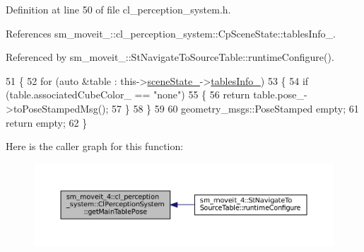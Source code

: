Definition at line 50 of file cl\+\_\+perception\+\_\+system.\+h.



References sm\+\_\+moveit\+\_\+::cl\+\_\+perception\+\_\+system\+::\+Cp\+Scene\+State\+::tables\+Info\+\_\+.



Referenced by sm\+\_\+moveit\+\_\+::\+St\+Navigate\+To\+Source\+Table\+::runtime\+Configure().


\begin{DoxyCode}
51             \{
52                 \textcolor{keywordflow}{for} (\textcolor{keyword}{auto} &table : this->\hyperlink{classsm__moveit__4_1_1cl__perception__system_1_1ClPerceptionSystem_a82ea8feeb2fa43349f91ed59137b3890}{sceneState\_}->\hyperlink{classsm__moveit__4_1_1cl__perception__system_1_1CpSceneState_a95f74dd16566d97e017650ccdf4b8a46}{tablesInfo\_})
53                 \{
54                     \textcolor{keywordflow}{if} (table.associatedCubeColor\_ == \textcolor{stringliteral}{"none"})
55                     \{
56                         \textcolor{keywordflow}{return} table.pose\_->toPoseStampedMsg();
57                     \}
58                 \}
59 
60                 geometry\_msgs::PoseStamped empty;
61                 \textcolor{keywordflow}{return} empty;
62             \}
\end{DoxyCode}
Here is the caller graph for this function\+:
\nopagebreak
\begin{figure}[H]
\begin{center}
\leavevmode
\includegraphics[width=350pt]{classsm__moveit__4_1_1cl__perception__system_1_1ClPerceptionSystem_a234d70a76bb5bf73f23d420c2b541632_icgraph}
\end{center}
\end{figure}
\mbox{\label{classsm__moveit__4_1_1cl__perception__system_1_1ClPerceptionSystem_ac4b944cebb2055a85a33129665df5dcf}} 

